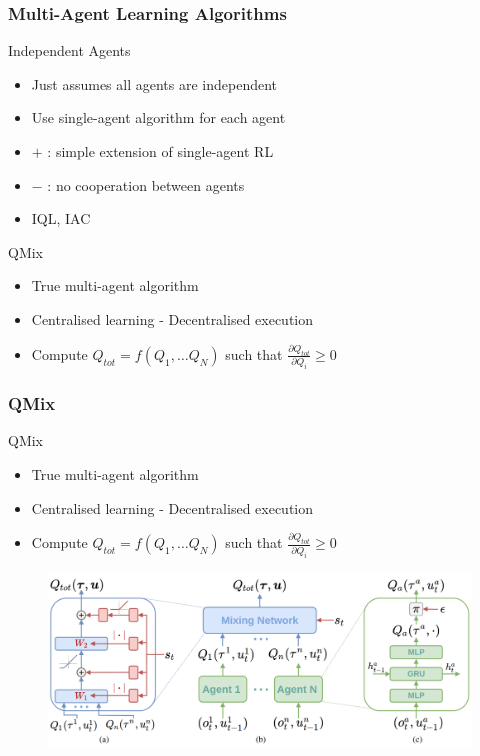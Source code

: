 \documentclass{beamer}
\begin{document}
\begin{frame}
\frametitle{Multi-Agent Learning Algorithms}
\begin{block}{Independent Agents}
\begin{itemize}
    \item Just assumes all agents are independent
    \item Use single-agent algorithm for each agent
    \item $+$ : simple extension of single-agent RL
    \item $-$ : no cooperation between agents
    \item IQL, IAC
\end{itemize}
\end{block}
\begin{block}{QMix}
\begin{itemize}
    \item True multi-agent algorithm
    \item Centralised learning - Decentralised execution
    \item Compute $Q_{tot} = f(Q_1, \dots Q_N)$ such that $\frac{\partial Q_{tot}}{\partial Q_i} \geq 0$
\end{itemize}
\end{block}
\end{frame}

\begin{frame}
\frametitle{QMix}
\begin{block}{QMix}
\begin{itemize}
    \item True multi-agent algorithm
    \item Centralised learning - Decentralised execution
    \item Compute $Q_{tot} = f(Q_1, \dots Q_N)$ such that $\frac{\partial Q_{tot}}{\partial Q_i} \geq 0$
\end{itemize}
\end{block}
\begin{figure}[htp]
    \centering
    \includegraphics[scale=0.2]{images/qmix_structure.png}
\end{figure}
\end{frame}
\end{document}
